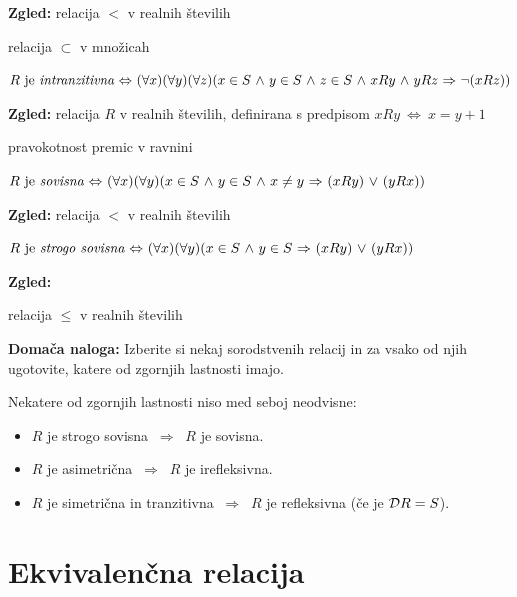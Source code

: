 \documentclass[11pt,paper=b5,footinclude,headinclude]{scrbook} %
\def\ali {{~\vee~}}
\def\inn {{~\wedge~}}
\def\sledi {{~\Rightarrow~}}
\def\cee {{~\Leftrightarrow~}}
\begin{document}
\textbf{ Zgled:} relacija $<$ v realnih številih

relacija $\subset$ v množicah

\bigskip

$R \textrm{ je {\em intranzitivna}} \cee (\forall x)(\forall y)(\forall z)(x\in S\inn y\in S\inn z\in S\inn xRy\inn yRz\sledi \neg(xRz))$


\textbf{ Zgled:}
relacija $R$ v realnih številih, definirana s predpisom $xRy \cee x = y + 1$

pravokotnost premic v ravnini

\bigskip

$R \textrm{ je {\em sovisna}} \cee (\forall x)(\forall y)(x\in S\inn y\in S
\inn x\neq y\sledi (xRy)\ali (yRx))$


\textbf{ Zgled:}
relacija $<$ v realnih  številih

\bigskip

$R \textrm{ je {\em strogo sovisna}} \cee (\forall x)(\forall y)(x\in S\inn y\in S
\sledi (xRy)\ali (yRx))$


\textbf{ Zgled:}

relacija $\le$ v realnih številih

\bigskip
\textbf{ Domača naloga:}
Izberite si nekaj sorodstvenih relacij in za vsako od njih ugotovite, katere od zgornjih lastnosti imajo.

\bigskip
Nekatere od zgornjih lastnosti niso med seboj neodvisne:
\begin{itemize}
  \item $R$ je strogo sovisna $\sledi$ $R$ je sovisna.
  \item $R$ je asimetrična $\sledi$ $R$ je irefleksivna.
  \item $R$ je simetrična in tranzitivna $\sledi$ $R$ je refleksivna (če je ${\cal D}R = S$).
\end{itemize}

\section{Ekvivalenčna relacija}
\end{document}
